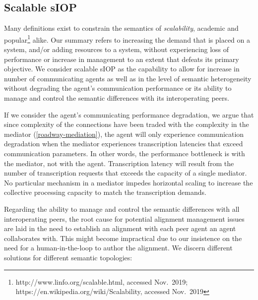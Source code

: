 \documentclass[sort&compress,preprint,authoryear,3p,twocolumn]{elsarticle}
\begin{document}
\hypertarget{scalable-siop}{%
\subsection{Scalable sIOP}\label{scalable-siop}}

Many definitions exist to constrain the semantics of \emph{scalability},
academic \citep[e.g.,][]{Neuman1994} and popular\footnote{http://www.linfo.org/scalable.html,
  accessed Nov.~2019; https://en.wikipedia.org/wiki/Scalability,
  accessed Nov.~2019} alike. Our summary refers to increasing the demand
that is placed on a system, and/or adding resources to a system, without
experiencing loss of performance or increase in management to an extent
that defeats its primary objective. We consider scalable sIOP as the
capability to allow for increase in number of communicating agents as
well as in the level of semantic heterogeneity without degrading the
agent's communication performance or its ability to manage and control
the semantic differences with its interoperating peers.

If we consider the agent's communicating performance degradation, we
argue that since complexity of the connections have been traded with the
complexity in the mediator (\cref{roadway-mediation}), the agent will
only experience communication degradation when the mediator experiences
transcription latencies that exceed communication parameters. In other
words, the performance bottleneck is with the mediator, not with the
agent. Transcription latency will result from the number of
transcription requests that exceeds the capacity of a single mediator.
No particular mechanism in a mediator impedes horizontal scaling to
increase the collective processing capacity to match the transcription
demands.

Regarding the ability to manage and control the semantic differences
with all interoperating peers, the root cause for potential alignment
management issues are laid in the need to establish an alignment with
each peer agent an agent collaborates with. This might become
impractical due to our insistence on the need for a human-in-the-loop to
author the alignment. We discern different solutions for different
semantic topologies:
\end{document}
